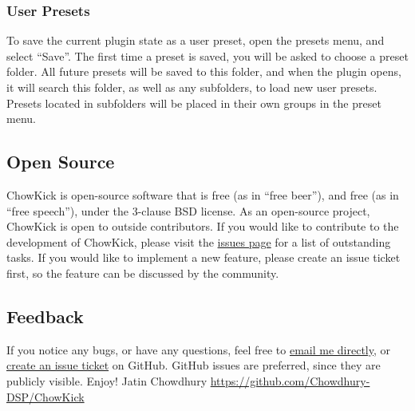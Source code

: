 \documentclass[landscape,twocolumn,a5paper]{manual}
\begin{document}
\subsubsection{User Presets}
To save the current plugin state as a user preset, open
the presets menu, and select ``Save''. The first time a
preset is saved, you will be asked to choose a preset
folder. All future presets will be saved to this folder,
and when the plugin opens, it will search this folder, as
well as any subfolders, to load new user presets.
Presets located in subfolders will be placed in their
own groups in the preset menu.

\subsection{Open Source}
ChowKick is open-source software that is free (as in ``free
beer''), and free (as in ``free speech''), under the
3-clause BSD license.
\newpar
As an open-source project, ChowKick is
open to outside contributors. If you would like to contribute
to the development of ChowKick, please visit the
\href{https://github.com/Chowdhury-DSP/ChowKick/issues}{issues page}
for a list of outstanding tasks. If you would like to implement
a new feature, please create an issue ticket first, so the
feature can be discussed by the community.

\subsection{Feedback}
If you notice any bugs, or have any questions, feel free
to \href{mailto:chowdsp@gmail.com}{email me directly},
or \href{https://github.com/Chowdhury-DSP/ChowKick/issues}{create an issue ticket}
on GitHub. GitHub issues are preferred, since they are publicly
visible.
\newpar
Enjoy!
\newpar
Jatin Chowdhury
\newpar
\href{https://github.com/Chowdhury-DSP/ChowKick}{https://github.com/Chowdhury-DSP/ChowKick}
\end{document}
